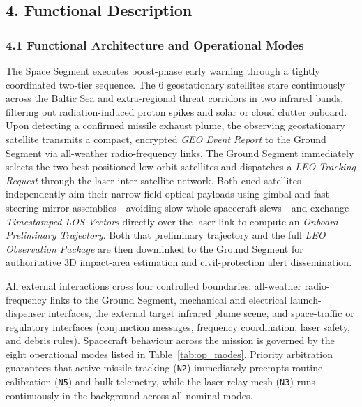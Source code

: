 \subsection{4. Functional Description}

\subsubsection{4.1 Functional Architecture and Operational Modes}

The Space Segment executes boost-phase early warning through a tightly coordinated two-tier sequence. The 6 geostationary satellites stare continuously across the Baltic Sea and extra-regional threat corridors in two infrared bands, filtering out radiation-induced proton spikes and solar or cloud clutter onboard. Upon detecting a confirmed missile exhaust plume, the observing geostationary satellite transmits a compact, encrypted \emph{GEO Event Report} to the Ground Segment via all-weather radio-frequency links. The Ground Segment immediately selects the two best-positioned low-orbit satellites and dispatches a \emph{LEO Tracking Request} through the laser inter-satellite network. Both cued satellites independently aim their narrow-field optical payloads using gimbal and fast-steering-mirror assemblies---avoiding slow whole-spacecraft slews---and exchange \emph{Timestamped LOS Vectors} directly over the laser link to compute an \emph{Onboard Preliminary Trajectory}. Both that preliminary trajectory and the full \emph{LEO Observation Package} are then downlinked to the Ground Segment for authoritative 3D impact-area estimation and civil-protection alert dissemination.

All external interactions cross four controlled boundaries: all-weather radio-frequency links to the Ground Segment, mechanical and electrical launch-dispenser interfaces, the external target infrared plume scene, and space-traffic or regulatory interfaces (conjunction messages, frequency coordination, laser safety, and debris rules). Spacecraft behaviour across the mission is governed by the eight operational modes listed in Table~\ref{tab:op_modes}. Priority arbitration guarantees that active missile tracking (\texttt{N2}) immediately preempts routine calibration (\texttt{N5}) and bulk telemetry, while the laser relay mesh (\texttt{N3}) runs continuously in the background across all nominal modes.

